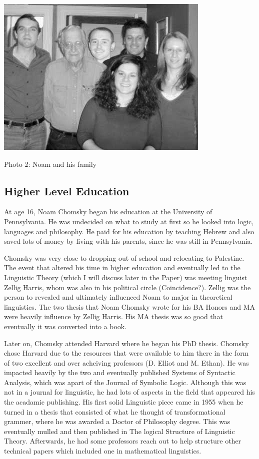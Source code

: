 \documentclass[conference]{IEEEtran}
\begin{document}
\includegraphics[scale=.5]{family.jpg} 

Photo 2: Noam and his family
\subsection{Higher Level Education}
At age 16, Noam Chomsky began his education at the University of Pennsylvania. He was undecided on what to study at first so he looked into logic, languages and philosophy. He paid for his education by teaching Hebrew and also saved lots of money by living with his parents, since he was still in Pennsylvania.

Chomsky was very close to dropping out of school and relocating to Palestine. The event that altered his time in higher education and eventually led to the Linguistic Theory (which I will discuss later in the Paper) was meeting linguist Zellig Harris, whom was also in his political circle (Coincidence?). Zellig was the person to revealed and ultimately influenced Noam to major in theoretical linguistics. The two thesis that Noam Chomsky wrote for his BA Honors and MA were heavily influence by Zellig Harris. His MA thesis was so good that eventually it was converted into a book. 

Later on, Chomsky attended Harvard where he began his PhD thesis. Chomsky chose Harvard due to the resources that were available to him there in the form of two excellent and over acheiving professors (D. Elliot and M. Ethan). He was impacted heavily by the two and eventually published Systems of Syntactic Analysis, which was apart of the Journal of Symbolic Logic. Although this was not in a journal for linguistic, he had lots of aspects in the field that appeared his the acadamic publishing. His first solid Linguistic piece came in 1955 when he turned in a thesis that consisted of what he thought of transformational grammer, where he was awarded a Doctor of Philosophy degree. This was eventually mulled and then published in The logical Structure of Linguistic Theory. Afterwards, he had some professors reach out to help structure other technical papers which included one in mathematical linguistics.
\end{document}
